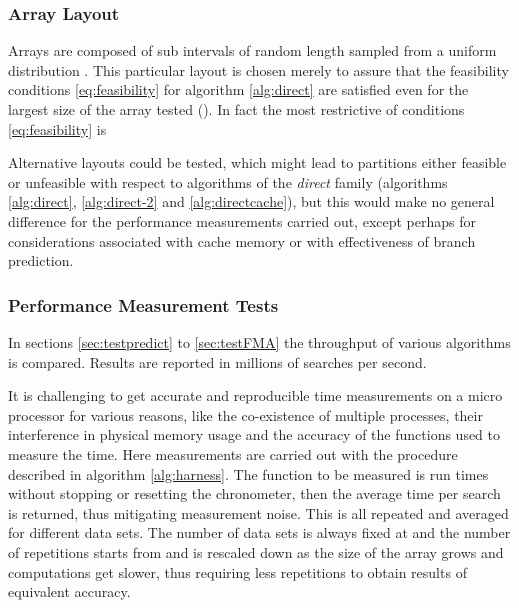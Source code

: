 \documentclass[preprint,1p,times]{elsarticle}
\begin{document}
\subsubsection{Array  Layout}
\label{sec:arrayx} 
Arrays  are composed of sub intervals of random length  sampled from a uniform distribution . This particular layout is chosen merely to assure that the feasibility conditions \eqref{eq:feasibility} for algorithm \ref{alg:direct} are satisfied even for the largest size of the array  tested (). In fact the most restrictive of conditions \eqref{eq:feasibility} is





Alternative layouts could be tested, which might lead to partitions either feasible or unfeasible with respect to algorithms of the \textit{direct} family (algorithms \ref{alg:direct}, \ref{alg:direct-2} and \ref{alg:directcache}), but this would make no general difference for the performance measurements carried out, except perhaps for considerations associated with cache memory or with effectiveness of branch prediction.

\subsubsection{Performance Measurement Tests}
In sections \ref{sec:testpredict} to \ref{sec:testFMA} the throughput of various algorithms is compared. Results are reported in millions of searches per second.

It is challenging to get accurate and reproducible time measurements on a micro processor for various reasons, like the co-existence of multiple processes, their interference in physical memory usage and the accuracy of the functions used to measure the time. Here measurements are carried out with the procedure described in algorithm \ref{alg:harness}. The function to be measured is run  times without stopping or resetting the chronometer, then the average time per search is returned, thus mitigating measurement noise. This is all repeated and averaged for  different data sets. The number of data sets is always fixed at  and the number of repetitions starts from  and is rescaled down as the size of the array  grows and computations get slower, thus requiring less repetitions to obtain results of equivalent accuracy.
\end{document}

